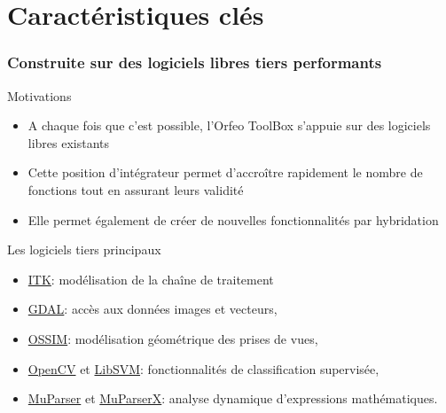 \documentclass[8pt]{beamer}
\begin{document}
\section{Caractéristiques clés}

\begin{frame}
\frametitle{Construite sur des logiciels libres tiers performants}
\begin{block}{Motivations}
\begin{itemize}
\item A chaque fois que c'est possible, l'Orfeo ToolBox s'appuie sur des
  logiciels libres existants
\item Cette position d'intégrateur permet d'accroître rapidement le nombre de fonctions tout en assurant leurs validité
\item Elle permet également de créer de nouvelles fonctionnalités par hybridation
\end{itemize}
\end{block}

\begin{block}{Les logiciels tiers principaux}
\begin{itemize}
\item \href{www.itk.org}{ITK}: modélisation de la chaîne de traitement
\item \href{www.gdal.org}{GDAL}: accès aux données images et vecteurs,
\item \href{www.ossim.org}{OSSIM}: modélisation géométrique des prises de vues,
\item \href{www.opencv.org}{OpenCV} et \href{www.libsvm.org}{LibSVM}: fonctionnalités de classification supervisée,
\item \href{www.muparser.org}{MuParser} et \href{www.muparserx.org}{MuParserX}:
analyse dynamique d'expressions mathématiques.
\end{itemize}
\end{block}


\end{frame}
\end{document}
